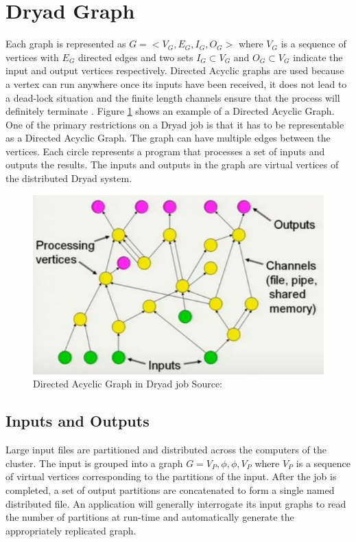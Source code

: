 \documentclass[9pt,twocolumn,twoside]{../../styles/osajnl}
\begin{document}
\section{Dryad Graph}
Each graph is represented as $G = <V_G, E_G, I_G, O_G>$ \cite{DryadMSR2} where $V_G$ is a   sequence of vertices with $E_G$ directed edges and two sets $I_G \subset V_G$ and  $O_G \subset V_G$ indicate the input and output vertices respectively. Directed Acyclic graphs are used because a vertex can run anywhere once its inputs have been received, it does not lead to a dead-lock situation and the finite length channels ensure that the process will definitely terminate \cite{www-DryadYT}. Figure \ref{fig:GraphDryad} shows an example of a Directed Acyclic Graph. One of the primary restrictions on a Dryad job is that it has to be representable as a Directed Acyclic Graph. The graph can have multiple edges between the vertices. Each circle represents a program that processes a set of inputs and outputs the results. The inputs and outputs in the graph are virtual vertices of the distributed Dryad system. 
\begin{figure}[htbp]
\begin{center}
\centering
\includegraphics[width=\linewidth]{images/img2}
\caption{Directed Acyclic Graph in Dryad job Source:\cite{www-DryadYT}}
\label{fig:GraphDryad}
\end{center}
\end{figure}
\subsection{Inputs and Outputs}
Large input files are partitioned and distributed
across the computers of the cluster. The input is grouped into a graph $G = V_P , \phi, \phi, V_P$ where $V_P$ \cite{DryadMSR3} is a sequence of virtual vertices corresponding to the partitions of the input. After the job is completed, a set of output partitions are concatenated to form a single named distributed file. An application will generally interrogate its input graphs to read the number of partitions at run-time and automatically generate the appropriately replicated graph.
\end{document}
